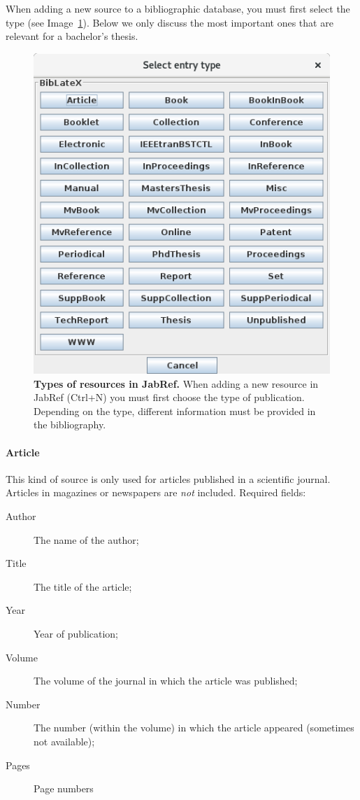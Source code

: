 When adding a new source to a bibliographic database, you must first select the type (see Image~\ref{fig:jabref-entrytypes}). Below we only discuss the most important ones that are relevant for a bachelor's thesis.

\begin{figure}
  \centering
  \includegraphics[width=0.6\linewidth]{img/jabref-entrytypes}
  \caption[Types of resources in JabRef]{\textbf{Types of resources in JabRef.} When adding a new resource in JabRef (Ctrl+N) you must first choose the type of publication. Depending on the type, different information must be provided in the bibliography.} 
  \label{fig:jabref-entrytypes}
\end{figure}

\paragraph{Article}

This kind of source is only used for articles published in a scientific journal. Articles in magazines or newspapers are \emph{not} included. Required fields:

\begin{description}
\item[Author] The name of the author;
\item[Title] The title of the article;
\item[Year] Year of publication;
\item[Volume] The volume of the journal in which the article was published;
\item[Number] The number (within the volume) in which the article appeared (sometimes not available);
\item[Pages] Page numbers
\end{description}

